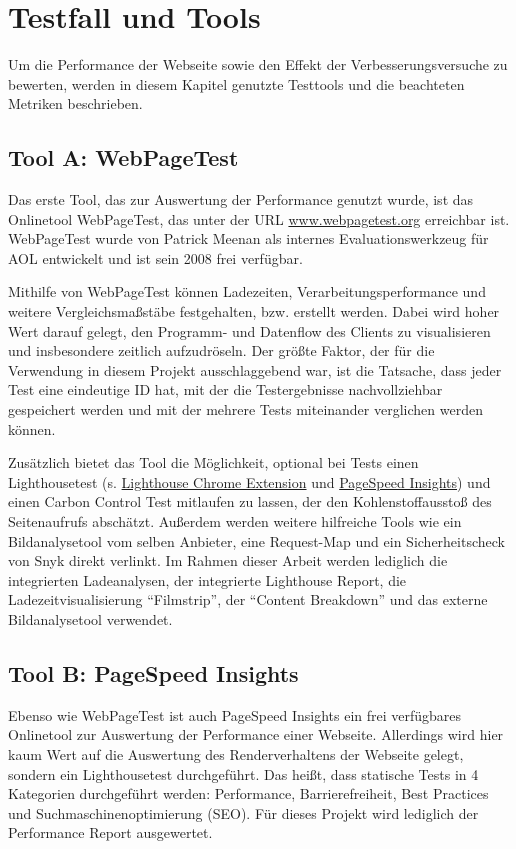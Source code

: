 \documentclass[11pt,a4paper]{article}
\begin{document}
\section{Testfall und Tools}
Um die Performance der Webseite sowie den Effekt der Verbesserungsversuche zu bewerten, werden in diesem Kapitel genutzte Testtools und die beachteten Metriken beschrieben.

\subsection{Tool A: WebPageTest}\label{subsec:WebPageTest}
Das erste Tool, das zur Auswertung der Performance genutzt wurde, ist das Onlinetool WebPageTest, das unter der URL \href{https://www.webpagetest.org}{www.webpagetest.org} erreichbar ist.
WebPageTest wurde von Patrick Meenan als internes Evaluationswerkzeug für AOL entwickelt und ist sein 2008 frei verfügbar.

Mithilfe von WebPageTest können Ladezeiten, Verarbeitungsperformance und weitere Vergleichsmaßstäbe festgehalten, bzw. erstellt werden.
Dabei wird hoher Wert darauf gelegt, den Programm- und Datenflow des Clients zu visualisieren und insbesondere zeitlich aufzudröseln.
Der größte Faktor, der für die Verwendung in diesem Projekt ausschlaggebend war, ist die Tatsache, dass jeder Test eine eindeutige ID hat, mit der die Testergebnisse nachvollziehbar gespeichert werden und mit der mehrere Tests miteinander verglichen werden können.

Zusätzlich bietet das Tool die Möglichkeit, optional bei Tests einen Lighthousetest (s. \hyperref[subsec:Lighthouse]{Lighthouse Chrome Extension} und \hyperref[subsec:PageSpeed]{PageSpeed Insights}) und einen Carbon Control Test mitlaufen zu lassen, der den Kohlenstoffausstoß des Seitenaufrufs abschätzt.
Außerdem werden weitere hilfreiche Tools wie ein Bildanalysetool vom selben Anbieter, eine Request-Map und ein Sicherheitscheck von Snyk direkt verlinkt.
Im Rahmen dieser Arbeit werden lediglich die integrierten Ladeanalysen, der integrierte Lighthouse Report, die Ladezeitvisualisierung \enquote{Filmstrip}, der \enquote{Content Breakdown} und das externe Bildanalysetool verwendet.

\subsection{Tool B: PageSpeed Insights}\label{subsec:PageSpeed}
Ebenso wie WebPageTest ist auch PageSpeed Insights ein frei verfügbares Onlinetool zur Auswertung der Performance einer Webseite.
Allerdings wird hier kaum Wert auf die Auswertung des Renderverhaltens der Webseite gelegt, sondern ein Lighthousetest durchgeführt. Das heißt, dass statische Tests in 4 Kategorien durchgeführt werden: Performance, Barrierefreiheit, Best Practices und Suchmaschinenoptimierung (SEO).
Für dieses Projekt wird lediglich der Performance Report ausgewertet.
\end{document}

